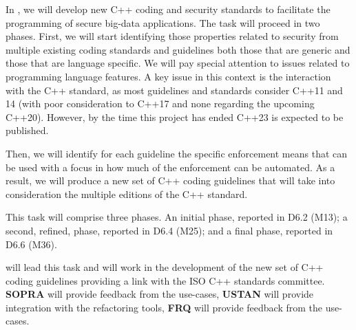 \begin{Workpackage}{\thewpno}
\begin{Task}
	\TaskResults{%
	}
	\TaskHeader{}
	
	In \theTask, we will develop new C++ coding and security standards to facilitate the programming of secure big-data applications. The task will proceed in two phases. 
First, we will start identifying those properties related to security from multiple existing coding standards and guidelines both those that are generic and those that are language specific. We will pay special attention to issues related to programming language features. A key issue in this context is the interaction with the C++ standard, as most guidelines and standards consider C++11 and 14 (with poor consideration to C++17 and none regarding the upcoming C++20). However, by the time this project has ended C++23 is expected to be published.

Then, we will identify for each guideline the specific enforcement means that can be used with a focus in how much of the enforcement can be automated. As a result, we will produce a new set of C++ coding guidelines that will take into consideration the multiple editions of the C++ standard.

This task will comprise three phases. An initial phase, reported in D6.2 (M13); a second, refined, phase, reported in D6.4 (M25); and a final phase, reported in D6.6 (M36).

\UCM will lead this task and will work in the development of the new set of C++ coding guidelines providing a link with the ISO C++ standards committee. \textbf{SOPRA} will provide feedback from the use-cases, \textbf{USTAN} will provide integration with the refactoring tools, \textbf{FRQ} will provide feedback from the use-cases. 

\end{Task}


\end{Workpackage}
